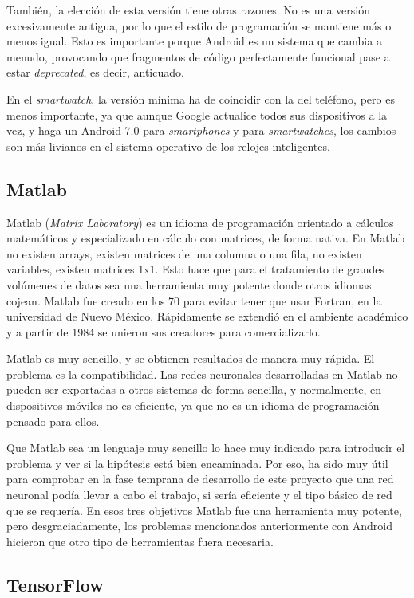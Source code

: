 \documentclass[12pt]{book}
\numberwithin{equation}{section}
\begin{document}
También, la elección de esta versión tiene otras razones. No es una versión excesivamente antigua, por lo que el estilo de programación se mantiene más o menos igual. Esto es importante porque Android es un sistema que cambia a menudo, provocando que fragmentos de código perfectamente funcional pase a estar \textit{deprecated}, es decir, anticuado.

En el \textit{smartwatch}, la versión mínima ha de coincidir con la del teléfono, pero es menos importante, ya que aunque Google actualice todos sus dispositivos a la vez, y haga un Android 7.0 para \textit{smartphones} y para \textit{smartwatches}, los cambios son más livianos en el sistema operativo de los relojes inteligentes.


\subsection{Matlab}

Matlab (\textit{Matrix Laboratory}) es un idioma de programación orientado a cálculos matemáticos y especializado en cálculo con matrices, de forma nativa. En Matlab no existen arrays, existen matrices de una columna o una fila, no existen variables, existen matrices 1x1. Esto hace que para el tratamiento de grandes volúmenes de datos sea una herramienta muy potente donde otros idiomas cojean. Matlab fue creado en los 70 para evitar tener que usar Fortran, en la universidad de Nuevo México. Rápidamente se extendió en el ambiente académico y a partir de 1984 se unieron sus creadores para comercializarlo. 

Matlab es muy sencillo, y se obtienen resultados de manera muy rápida. El problema es la compatibilidad. Las redes neuronales desarrolladas en Matlab no pueden ser exportadas a otros sistemas de forma sencilla, y normalmente, en dispositivos móviles no es eficiente, ya que no es un idioma de programación pensado para ellos.

Que Matlab sea un lenguaje muy sencillo lo hace muy indicado para introducir el problema y ver si la hipótesis está bien encaminada. Por eso, ha sido muy útil para comprobar en la fase temprana de desarrollo de este proyecto que una red neuronal podía llevar a cabo el trabajo, si sería eficiente y el tipo básico de red que se requería. En esos tres objetivos Matlab fue una herramienta muy potente, pero desgraciadamente, los problemas mencionados anteriormente con Android hicieron que otro tipo de herramientas fuera necesaria.

\subsection{TensorFlow}
\end{document}
